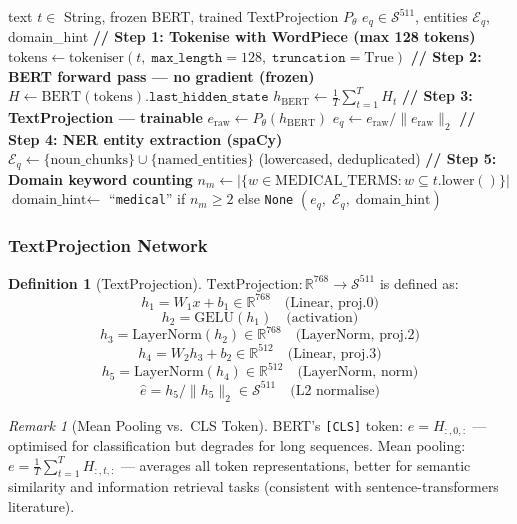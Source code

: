 \documentclass[12pt,a4paper]{article}
\theoremstyle{definition}
\newtheorem{definition}{Definition}[section]
\theoremstyle{plain}
\theoremstyle{remark}
\newtheorem{remark}{Remark}[section]
\newcommand{\R}{\mathbb{R}}
\newcommand{\Sph}{\mathcal{S}}
\newcommand{\LN}{\mathrm{LayerNorm}}
\newcommand{\GELU}{\mathrm{GELU}}
\begin{document}
\begin{algorithm}[H]
\caption{TextEncoderV2.encode($\text{text}$)}
\label{alg:textencode}
\begin{algorithmic}[1]
\Require text $t \in$ String, frozen BERT, trained TextProjection $P_\theta$
\Ensure $e_q \in \Sph^{511}$, entities $\mathcal{E}_q$, domain\_hint
\State \textbf{// Step 1: Tokenise with WordPiece (max 128 tokens)}
\State $\text{tokens} \gets \text{tokeniser}(t,\; \texttt{max\_length}=128,\; \texttt{truncation}=\text{True})$
\State \textbf{// Step 2: BERT forward pass — no gradient (frozen)}
\State $H \gets \text{BERT}(\text{tokens})\texttt{.last\_hidden\_state}$ 
\State $h_{\text{BERT}} \gets \frac{1}{T}\sum_{t=1}^T H_{t}$ 
\State \textbf{// Step 3: TextProjection — trainable}
\State $e_{\text{raw}} \gets P_\theta(h_{\text{BERT}})$ 
\State $e_q \gets e_{\text{raw}} / \|e_{\text{raw}}\|_2$ \Comment{L2 normalise onto $\Sph^{511}$}
\State \textbf{// Step 4: NER entity extraction (spaCy)}
\State $\mathcal{E}_q \gets \{\text{noun\_chunks}\} \cup \{\text{named\_entities}\}$ (lowercased, deduplicated)
\State \textbf{// Step 5: Domain keyword counting}
\State $n_m \gets |\{w \in \text{MEDICAL\_TERMS} : w \subseteq t.\text{lower}()\}|$
\State $\text{domain\_hint} \gets$ ``\texttt{medical}'' if $n_m \ge 2$ else \texttt{None}
\State \Return $(e_q,\; \mathcal{E}_q,\; \text{domain\_hint})$
\end{algorithmic}
\end{algorithm}

\subsubsection{TextProjection Network}

\begin{definition}[TextProjection]
$\text{TextProjection} : \R^{768} \to \Sph^{511}$ is defined as:
\[
  h_1 = W_1 x + b_1 \in \R^{768} \quad\text{(Linear, proj.0)}
\]
\[
  h_2 = \GELU(h_1) \quad\text{(activation)}
\]
\[
  h_3 = \LN(h_2) \in \R^{768} \quad\text{(LayerNorm, proj.2)}
\]
\[
  h_4 = W_2 h_3 + b_2 \in \R^{512} \quad\text{(Linear, proj.3)}
\]
\[
  h_5 = \LN(h_4) \in \R^{512} \quad\text{(LayerNorm, norm)}
\]
\[
  \hat{e} = h_5 / \|h_5\|_2 \in \Sph^{511} \quad\text{(L2 normalise)}
\]
\end{definition}

\begin{remark}[Mean Pooling vs.\ CLS Token]
BERT's \texttt{[CLS]} token: $e = H_{:,0,:}$ — optimised for classification but
degrades for long sequences. Mean pooling: $e = \frac{1}{T}\sum_{t=1}^T H_{:,t,:}$
— averages all token representations, better for semantic similarity and information
retrieval tasks (consistent with sentence-transformers literature).
\end{remark}
\end{document}
